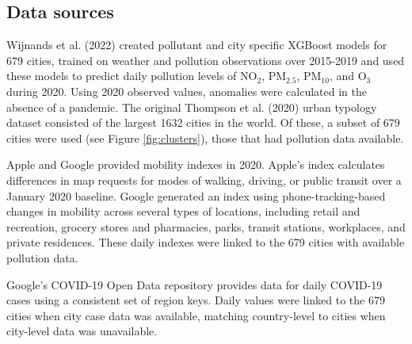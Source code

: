\documentclass[preprint,12pt]{elsarticle}
\begin{document}
\subsection*{Data sources}


Wijnands et al. (2022)\cite{Wijnands2022} created pollutant and city specific XGBoost models for 679 cities, trained on weather and pollution observations over 2015-2019 and used these models to predict daily pollution levels of NO$_{2}$, PM$_{2.5}$, PM$_{10}$, and O$_{3}$ during 2020. Using 2020 observed values, anomalies were calculated in the absence of a pandemic. The original Thompson et al. (2020)\cite{Thompson2020} urban typology dataset consisted of the largest 1632 cities in the world. Of these, a subset of 679 cities were used (see Figure \ref{fig:clusters}), those that had pollution data available.

Apple\cite{Apple2020} and Google\cite{Google2020} provided mobility indexes in 2020. Apple's index calculates differences in map requests for modes of walking, driving, or public transit over a January 2020 baseline. Google generated an index using phone-tracking-based changes in mobility across several types of locations, including retail and recreation, grocery stores and pharmacies, parks, transit stations, workplaces, and private residences. These daily indexes were linked to the 679 cities with available pollution data.

Google's COVID-19 Open Data repository\cite{Google2022} provides data for daily COVID-19 cases using a consistent set of region keys. Daily values were linked to the 679 cities when city case data was available, matching country-level to cities when city-level data was unavailable.


\end{document}
